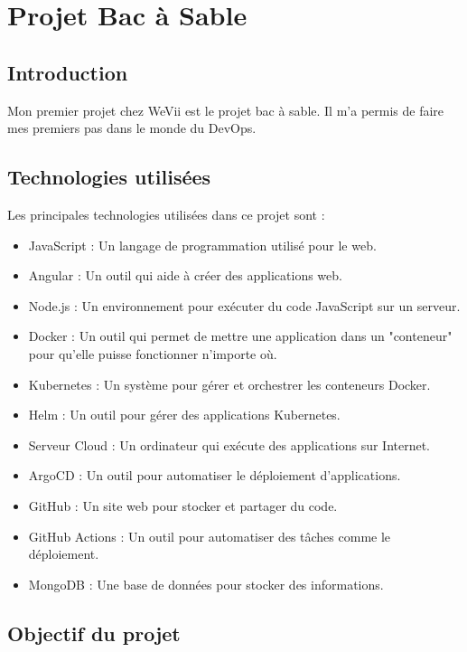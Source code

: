 \chapter{Projet Bac à Sable} %

\section{Introduction}

Mon premier projet chez WeVii est le projet bac à sable.
Il m’a permis de faire mes premiers pas dans le monde du DevOps.

\section{Technologies utilisées}

Les principales technologies utilisées dans ce projet sont :
\begin{multicols}{2}
    \begin{itemize}
        \item JavaScript : Un langage de programmation utilisé pour le web.
        \item Angular : Un outil qui aide à créer des applications web.
        \item Node.js : Un environnement pour exécuter du code JavaScript sur un serveur.
        \item Docker : Un outil qui permet de mettre une application dans un "conteneur" pour qu'elle puisse fonctionner n'importe où.
        \item Kubernetes : Un système pour gérer et orchestrer les conteneurs Docker.
        \item Helm : Un outil pour gérer des applications Kubernetes.
        \item Serveur Cloud : Un ordinateur qui exécute des applications sur Internet.
        \item ArgoCD : Un outil pour automatiser le déploiement d'applications.
        \item GitHub : Un site web pour stocker et partager du code.
        \item GitHub Actions : Un outil pour automatiser des tâches comme le déploiement.
        \item MongoDB : Une base de données pour stocker des informations.
    \end{itemize}
\end{multicols}

\section{Objectif du projet}

